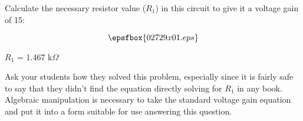 

Calculate the necessary resistor value ($R_1$) in this circuit to give it a voltage gain of 15:

$$\epsfbox{02729x01.eps}$$







$R_1$ = 1.467 k$\Omega$







Ask your students how they solved this problem, especially since it is fairly safe to say that they didn't find the equation directly solving for $R_1$ in any book.  Algebraic manipulation is necessary to take the standard voltage gain equation and put it into a form suitable for use answering this question.




